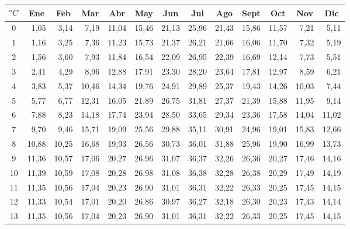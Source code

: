 \begin{table}[ht]
\centering
\begin{tabular}{|c|r|r|r|r|r|r|r|r|r|r|r|r|}
\hline
$\degree C$ &
  \multicolumn{1}{c|}{Ene} &
  \multicolumn{1}{c|}{Feb} &
  \multicolumn{1}{c|}{Mar} &
  \multicolumn{1}{c|}{Abr} &
  \multicolumn{1}{c|}{May} &
  \multicolumn{1}{c|}{Jun} &
  \multicolumn{1}{c|}{Jul} &
  \multicolumn{1}{c|}{Ago} &
  \multicolumn{1}{c|}{Sept} &
  \multicolumn{1}{c|}{Oct} &
  \multicolumn{1}{c|}{Nov} &
  \multicolumn{1}{c|}{Dic} \\ \hline
0  & 1,05  & 3,14  & 7,19  & 11,04 & 15,46 & 21,13 & 25,96 & 21,43 & 15,86 & 11,57 & 7,21  & 5,11  \\ \hline
1  & 1,16  & 3,25  & 7,36  & 11,23 & 15,73 & 21,37 & 26,21 & 21,66 & 16,06 & 11,70 & 7,32  & 5,19  \\ \hline
2  & 1,56  & 3,60  & 7,93  & 11,84 & 16,54 & 22,09 & 26,95 & 22,39 & 16,69 & 12,14 & 7,73  & 5,51  \\ \hline
3  & 2,41  & 4,29  & 8,96  & 12,88 & 17,91 & 23,30 & 28,20 & 23,64 & 17,81 & 12,97 & 8,59  & 6,21  \\ \hline
4  & 3,83  & 5,37  & 10,46 & 14,34 & 19,76 & 24,91 & 29,89 & 25,37 & 19,43 & 14,26 & 10,03 & 7,44  \\ \hline
5  & 5,77  & 6,77  & 12,31 & 16,05 & 21,89 & 26,75 & 31,81 & 27,37 & 21,39 & 15,88 & 11,95 & 9,14  \\ \hline
6  & 7,88  & 8,23  & 14,18 & 17,74 & 23,94 & 28,50 & 33,65 & 29,34 & 23,36 & 17,58 & 14,04 & 11,02 \\ \hline
7  & 9,70  & 9,46  & 15,71 & 19,09 & 25,56 & 29,88 & 35,11 & 30,91 & 24,96 & 19,01 & 15,83 & 12,66 \\ \hline
8  & 10,88 & 10,25 & 16,68 & 19,93 & 26,56 & 30,73 & 36,01 & 31,88 & 25,96 & 19,90 & 16,99 & 13,73 \\ \hline
9  & 11,36 & 10,57 & 17,06 & 20,27 & 26,96 & 31,07 & 36,37 & 32,26 & 26,36 & 20,27 & 17,46 & 14,16 \\ \hline
10 & 11,39 & 10,59 & 17,08 & 20,28 & 26,98 & 31,08 & 36,38 & 32,28 & 26,38 & 20,29 & 17,49 & 14,19 \\ \hline
11 & 11,35 & 10,56 & 17,04 & 20,23 & 26,90 & 31,01 & 36,31 & 32,22 & 26,33 & 20,25 & 17,45 & 14,15 \\ \hline
12 & 11,33 & 10,54 & 17,01 & 20,20 & 26,86 & 30,97 & 36,27 & 32,18 & 26,30 & 20,23 & 17,43 & 14,14 \\ \hline
13 & 11,35 & 10,56 & 17,04 & 20,23 & 26,90 & 31,01 & 36,31 & 32,22 & 26,33 & 20,25 & 17,45 & 14,15 \\ \hline

\end{tabular}
\end{table}

